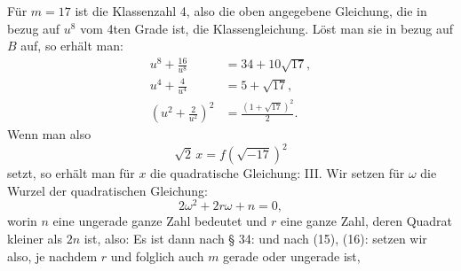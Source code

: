Für $m = 17$ ist die Klassenzahl 4, also die oben angegebene
Gleichung, die in bezug auf $u^8$ vom 4ten Grade ist, die Klassengleichung.
Löst man sie in bezug auf $B$ auf, so erhält man:
\[
\begin{aligned}
u^8 + \frac{16}{u^8} &= 34 + 10\sqrt{17}, \\
u^4 + \frac{4}{u^4} &= 5 + \sqrt{17}, \\
\left(u^2 + \frac{2}{u^2}\right)^2 &= \frac{(1+\sqrt{17})^2}{2}.
\end{aligned}
\]
Wenn man also
\[ \sqrt2\,x = f(\sqrt{-17})^2 \]
setzt, so erhält man für $x$ die quadratische Gleichung:
III. Wir setzen für $\omega$ die Wurzel der quadratischen
Gleichung:
\[ 2\omega^2 + 2r\omega + n = 0, \]
worin $n$ eine ungerade ganze Zahl bedeutet und $r$ eine ganze
Zahl, deren Quadrat kleiner als $2n$ ist, also:
Es ist dann nach § 34:
und nach (15), (16):
setzen wir also, je nachdem $r$ und folglich auch $m$ gerade oder
ungerade ist,
